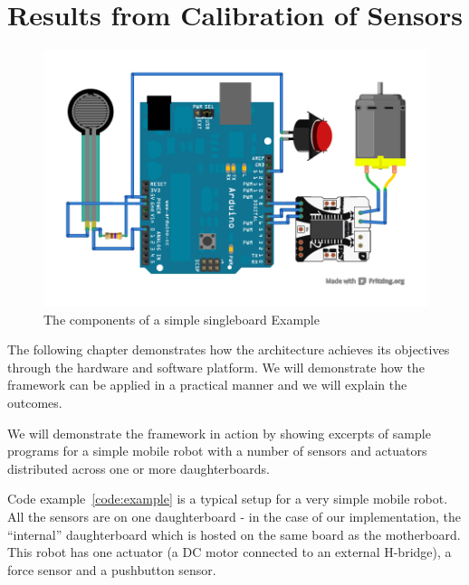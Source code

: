 \section{Results from Calibration of Sensors}




\begin{figure}[H]
  \begin{center}
    \includegraphics[width=1.0\columnwidth]{Figures/simple-example.pdf}
    \caption{The components of a simple singleboard \xten Example}
  \end{center}
\end{figure}

The following chapter demonstrates how the \xten architecture achieves its objectives through the hardware and software platform. We will demonstrate how the framework can be applied in a practical manner and we will explain the outcomes.

 We will demonstrate the framework in action by showing excerpts of sample programs for a simple mobile robot with a number of sensors and actuators distributed across one or more daughterboards.


Code example~\ref{code:example} is a typical setup for a very simple mobile robot. All the sensors are on one daughterboard - in the case of our implementation, the ``internal'' daughterboard which is hosted on the same board as the motherboard. This robot has one actuator (a DC motor connected to an external H-bridge), a force sensor and a pushbutton sensor.


